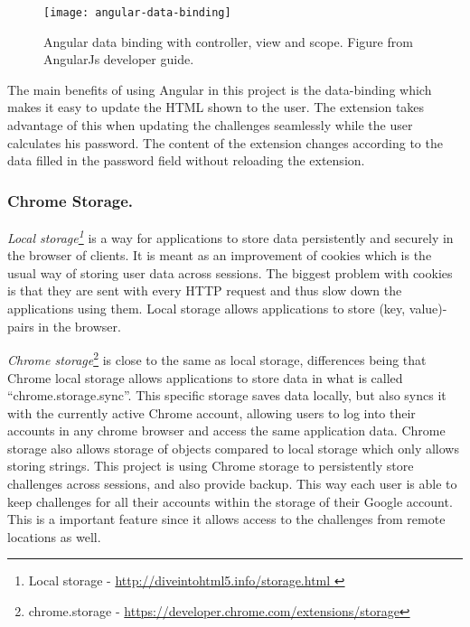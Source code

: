 \begin{figure}[ht]
    \texttt{[image: angular-data-binding]} 
    \caption{Angular data binding with controller, view and scope. Figure from AngularJs developer guide.}
    \label{angular-data-binding}
\end{figure}


\par The main benefits of using Angular in this project is the data-binding which makes it easy to update the HTML shown to the user. The extension takes advantage of this when updating the challenges seamlessly while the user calculates his password. The content of the extension changes according to the data filled in the password field without reloading the extension. 

\subsubsection{Chrome Storage.}\label{chrome-storage}
\emph{Local storage\footnote{Local storage - \url{ http://diveintohtml5.info/storage.html }}} is a way for applications to store data persistently and securely in the browser of clients. It is meant as an improvement of cookies which is the usual way of storing user data across sessions. The biggest problem with cookies is that they are sent with every HTTP request and thus slow down the applications using them. Local storage allows applications to store (key, value)-pairs in the browser. 
\par \emph{Chrome storage}\footnote{chrome.storage - \url{https://developer.chrome.com/extensions/storage}} is close to the same as local storage, differences being that Chrome local storage allows applications to store data in what is called ``chrome.storage.sync''. This specific storage saves data locally, but also syncs it with the currently active Chrome account, allowing users to log into their accounts in any chrome browser and access the same application data. Chrome storage also allows storage of objects compared to local storage which only allows storing strings. This project is using Chrome storage to persistently store challenges across sessions, and also provide backup. This way each user is able to keep challenges for all their accounts within the storage of their Google account. This is a important feature since it allows access to the challenges from remote locations as well.

